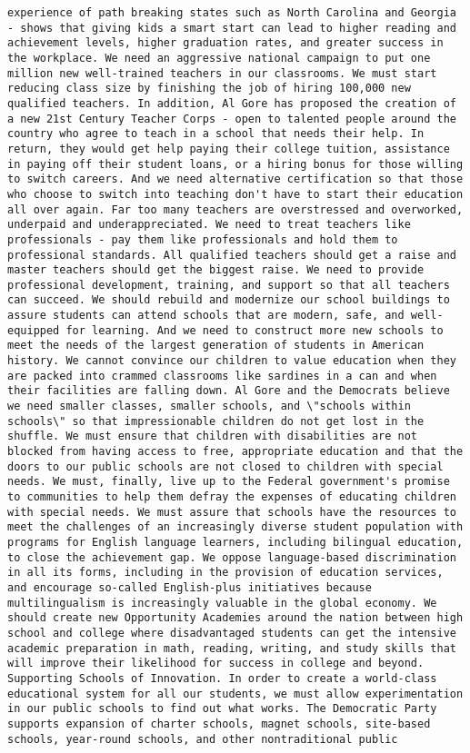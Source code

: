 \documentclass[
]{article}
\begin{document}
\begin{verbatim}
experience of path breaking states such as North Carolina and Georgia - shows that giving kids a smart start can lead to higher reading and achievement levels, higher graduation rates, and greater success in the workplace. We need an aggressive national campaign to put one million new well-trained teachers in our classrooms. We must start reducing class size by finishing the job of hiring 100,000 new qualified teachers. In addition, Al Gore has proposed the creation of a new 21st Century Teacher Corps - open to talented people around the country who agree to teach in a school that needs their help. In return, they would get help paying their college tuition, assistance in paying off their student loans, or a hiring bonus for those willing to switch careers. And we need alternative certification so that those who choose to switch into teaching don't have to start their education all over again. Far too many teachers are overstressed and overworked, underpaid and underappreciated. We need to treat teachers like professionals - pay them like professionals and hold them to professional standards. All qualified teachers should get a raise and master teachers should get the biggest raise. We need to provide professional development, training, and support so that all teachers can succeed. We should rebuild and modernize our school buildings to assure students can attend schools that are modern, safe, and well-equipped for learning. And we need to construct more new schools to meet the needs of the largest generation of students in American history. We cannot convince our children to value education when they are packed into crammed classrooms like sardines in a can and when their facilities are falling down. Al Gore and the Democrats believe we need smaller classes, smaller schools, and \"schools within schools\" so that impressionable children do not get lost in the shuffle. We must ensure that children with disabilities are not blocked from having access to free, appropriate education and that the doors to our public schools are not closed to children with special needs. We must, finally, live up to the Federal government's promise to communities to help them defray the expenses of educating children with special needs. We must assure that schools have the resources to meet the challenges of an increasingly diverse student population with programs for English language learners, including bilingual education, to close the achievement gap. We oppose language-based discrimination in all its forms, including in the provision of education services, and encourage so-called English-plus initiatives because multilingualism is increasingly valuable in the global economy. We should create new Opportunity Academies around the nation between high school and college where disadvantaged students can get the intensive academic preparation in math, reading, writing, and study skills that will improve their likelihood for success in college and beyond. Supporting Schools of Innovation. In order to create a world-class educational system for all our students, we must allow experimentation in our public schools to find out what works. The Democratic Party supports expansion of charter schools, magnet schools, site-based schools, year-round schools, and other nontraditional public 
\end{verbatim}
\end{document}
